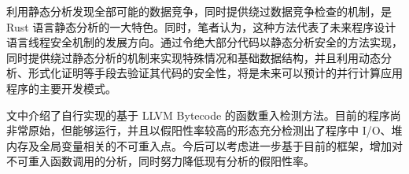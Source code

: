 \documentclass[a4paper, 12pt]{article} %
\newcounter{code}
\numberwithin{equation}{section}
\begin{document}
利用静态分析发现全部可能的数据竞争，同时提供绕过数据竞争检查的机制，是 Rust 语言静态分析的一大特色。同时，笔者认为，这种方法代表了未来程序设计语言线程安全机制的发展方向。通过令绝大部分代码以静态分析安全的方法实现，同时提供绕过静态分析的机制来实现特殊情况和基础数据结构，并且利用动态分析、形式化证明等手段去验证其代码的安全性，将是未来可以预计的并行计算应用程序的主要开发模式。

文中介绍了自行实现的基于 LLVM Bytecode 的函数重入检测方法。目前的程序尚非常原始，但能够运行，并且以假阳性率较高的形态充分检测出了程序中 I/O、堆内存及全局变量相关的不可重入点。今后可以考虑进一步基于目前的框架，增加对不可重入函数调用的分析，同时努力降低现有分析的假阳性率。

\end{document}
